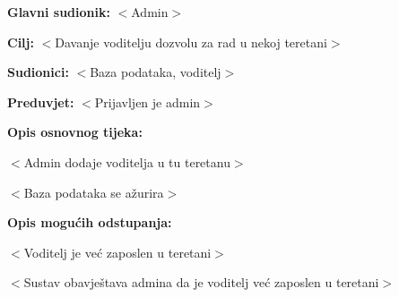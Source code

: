 					\noindent {}
					\begin{packed_item}
	
						\item \textbf{Glavni sudionik: } $<$Admin$>$
						\item  \textbf{Cilj:} $<$Davanje voditelju dozvolu za rad u nekoj teretani$>$
						\item  \textbf{Sudionici:} $<$Baza podataka, voditelj$>$
						\item  \textbf{Preduvjet:} $<$Prijavljen je admin$>$
						\item  \textbf{Opis osnovnog tijeka:}
						
						\item[] \begin{packed_enum}
	
							\item $<$Admin dodaje voditelja u tu teretanu$>$
							\item $<$Baza podataka se ažurira$>$
						\end{packed_enum}
						
						\item  \textbf{Opis mogućih odstupanja:}
						
						\item[] \begin{packed_item}
	
							\item[1.] $<$Voditelj je već zaposlen u teretani$>$
							\item[] \begin{packed_enum}
								
								\item[a)] $<$Sustav obavještava admina da je voditelj već zaposlen u teretani$>$
				
								
							\end{packed_enum}
	
							
						\end{packed_item}
					\end{packed_item}
					
